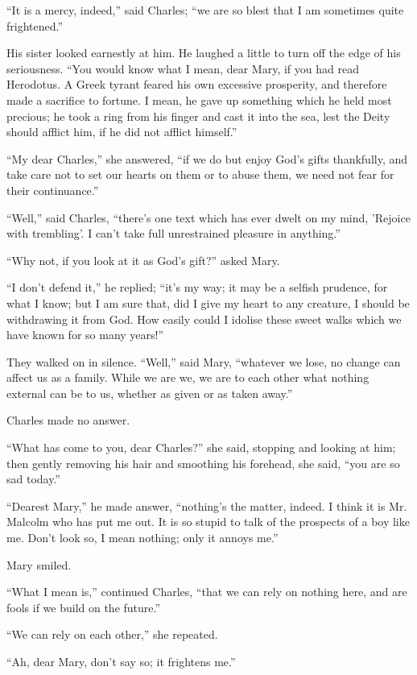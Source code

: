 ``It is a mercy, indeed,'' said Charles; ``we are so
blest that I am sometimes quite frightened.''

His sister looked earnestly at him. He laughed a little to turn off
the edge of his seriousness. ``You would know what I mean, dear
Mary, if you had read Herodotus. A Greek tyrant feared his own
excessive prosperity, and therefore made a sacrifice to fortune. I
mean, he gave up something which he held most precious; he took a ring
from his finger and cast it into the sea, lest the Deity should
afflict him, if he did not afflict himself.''

``My dear Charles,'' she answered, ``if we do but enjoy
God's gifts thankfully, and take care not to set our hearts on
them or to abuse them, we need not fear for their continuance.''

``Well,'' said Charles, ``there's one text which has ever
dwelt on my mind, 'Rejoice with trembling'. I can't take full
unrestrained pleasure in anything.''

``Why not, if you look at it as God's gift?'' asked Mary.

``I don't defend it,'' he replied; ``it's my way; it
may be a selfish prudence, for what I know; but I am sure that, did I
give my heart to any creature, I should be withdrawing it from God.
How easily could I idolise these sweet walks which we have known for
so many years!''

They walked on in silence. ``Well,'' said Mary,
``whatever we lose, no change can affect us as a family. While we
are we, we are to each other what nothing external can be to us,
whether as given or as taken away.''

Charles made no answer.

``What has come to you, dear Charles?'' she said, stopping
and looking at him; then gently removing his hair and smoothing his
forehead, she said, ``you are so sad today.''

``Dearest Mary,'' he made answer, ``nothing's the
matter, indeed. I think it is Mr. Malcolm who has put me out. It is so
stupid to talk of the prospects of a boy like me. Don't look so, I
mean nothing; only it annoys me.''

Mary smiled.

``What I mean is,'' continued Charles, ``that we can
rely on nothing here, and are fools if we build on the future.''

``We can rely on each other,'' she repeated.

``Ah, dear Mary, don't say so; it frightens me.''

